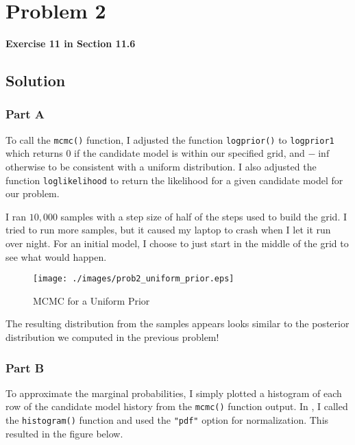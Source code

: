
\begingroup
\allowdisplaybreaks

\newpage
\section{Problem 2}

\textbf{Exercise 11 in Section 11.6}

\subsection{Solution}

\subsubsection{Part A}

To call the \verb|mcmc()| function, I adjusted the function \verb|logprior()| to \verb|logprior1| which returns $0$ if the candidate model is within our specified grid, and $-\inf$ otherwise to be consistent with a uniform distribution. I also adjusted the function \verb|loglikelihood| to return the likelihood for a given candidate model for our problem. 

I ran $10,000$ samples with a step size of half of the steps used to build the grid. I tried to run more samples, but it caused my laptop to crash when I let it run over night. For an initial model, I choose to just start in the middle of the grid to see what would happen. 

\begin{figure}[h] 
	\centering
	\texttt{[image: ./images/prob2\_uniform\_prior.eps]}
	\caption{MCMC for a Uniform Prior}
	\label{fig: prob2 mcmc uniform prior}
\end{figure}
\FloatBarrier

The resulting distribution from the samples appears looks similar to the posterior distribution we computed in the previous problem! 


\subsubsection{Part B}

To approximate the marginal probabilities, I simply plotted a histogram of each row of the candidate model history from the \verb|mcmc()| function output. In \MATLAB, I called the \verb|histogram()| function and used the \verb|"pdf"| option for normalization. This resulted in the figure below. 

